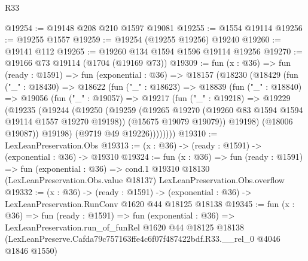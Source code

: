 \begin{lexlean}{R33}
\begin{coremodule}
@19254 := @19148 @208 @210 @1597 @19081
@19255 := @1554 @19114
@19256 := @19255 @1557
@19259 := @19254 (@19255 @19256) @19240
@19260 := @19141 @112
@19265 := @19260 @134 @1594 @1596 @19114 @19256
@19270 := @19166 @73 @19114 (@1704 (@19169 @73))
@19309 := fun (x : @36) =>
  fun (ready : @1591) =>
  fun (exponential : @36) =>
  @18157
    (@18230
      (@18429
        (fun ("_" : @18430) =>
        @18622
          (fun ("_" : @18623) =>
          @18839
            (fun ("_" : @18840) =>
            @19056
              (fun ("_" : @19057) =>
              @19217
                (fun ("_" : @19218) =>
                @19229
                  (@19235
                    (@19244
                      (@19250
                        (@19259
                          (@19265 @19270 (@19260 @83 @1594 @1594 @19114 @1557 @19270 @19198))
                          (@15675 @19079 @19079))
                        @19198)
                      (@18006 @19087))
                    @19198)
                  (@9719 @49 @19226))))))))
@19310 := LexLeanPreservation.Obs
@19313 := (x : @36) -> (ready : @1591) -> (exponential : @36) -> @19310
@19324 := fun (x : @36) =>
  fun (ready : @1591) =>
  fun (exponential : @36) =>
  cond.{1} @19310 @18130 (LexLeanPreservation.Obs.value @18137) LexLeanPreservation.Obs.overflow
@19332 := (x : @36) ->
  (ready : @1591) -> (exponential : @36) -> LexLeanPreservation.RunConv @1620 @44 @18125 @18138
@19345 := fun (x : @36) =>
  fun (ready : @1591) =>
  fun (exponential : @36) =>
  LexLeanPreservation.run_of_funRel
    @1620
    @44
    @18125
    @18138
    (LexLeanPreserve.Cafda79c757163ffe4c6f07f487422bdf.R33.__rel_0 @4046 @1846 @1550)
\end{coremodule}
\end{lexlean}
